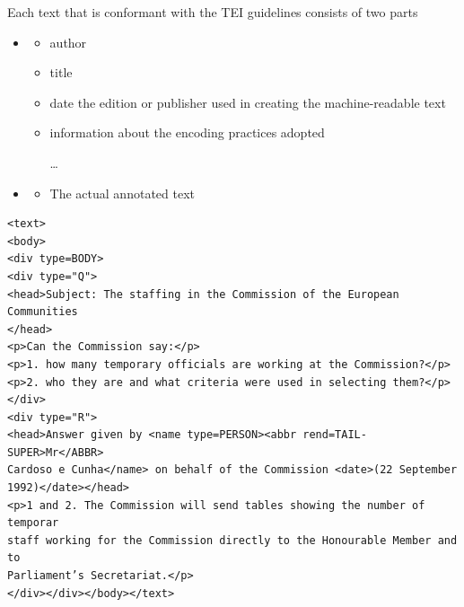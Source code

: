 \documentclass[a4paper,landscape,headrule,footrule,dvips]{foils}
\begin{document}
\begin{CJK}{UTF8}{min}
Each text that is conformant with the TEI guidelines
consists of two parts
\begin{itemize}
\item {}
  \begin{itemize}
  \item author
  \item title
  \item date the edition or publisher used in creating the machine-readable text
  \item information about the encoding practices adopted
   \item[\ldots]
   \end{itemize}
 \item {}
   \begin{itemize}
   \item The actual annotated text
   \end{itemize}
 \end{itemize}
   

\begin{verbatim}
<text>
<body>
<div type=BODY>
<div type="Q">
<head>Subject: The staffing in the Commission of the European Communities
</head>
<p>Can the Commission say:</p>
<p>1. how many temporary officials are working at the Commission?</p>
<p>2. who they are and what criteria were used in selecting them?</p>
</div>
<div type="R">
<head>Answer given by <name type=PERSON><abbr rend=TAIL-SUPER>Mr</ABBR>
Cardoso e Cunha</name> on behalf of the Commission <date>(22 September
1992)</date></head>
<p>1 and 2. The Commission will send tables showing the number of temporar
staff working for the Commission directly to the Honourable Member and to
Parliament’s Secretariat.</p>
</div></div></body></text>
\end{verbatim}





\end{CJK}
\end{document}
